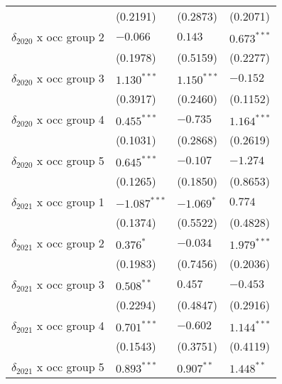 \begin{tabular}{llll}
                                       &           (0.2191) &           (0.2873) &           (0.2071) \\
$\delta_{2020}$ x occ group 2          &           $-0.066$ &            $0.143$ &      $0.673^{***}$ \\
                                       &           (0.1978) &           (0.5159) &           (0.2277) \\
$\delta_{2020}$ x occ group 3          &      $1.130^{***}$ &      $1.150^{***}$ &           $-0.152$ \\
                                       &           (0.3917) &           (0.2460) &           (0.1152) \\
$\delta_{2020}$ x occ group 4          &      $0.455^{***}$ &           $-0.735$ &      $1.164^{***}$ \\
                                       &           (0.1031) &           (0.2868) &           (0.2619) \\
$\delta_{2020}$ x occ group 5          &      $0.645^{***}$ &           $-0.107$ &           $-1.274$ \\
                                       &           (0.1265) &           (0.1850) &           (0.8653) \\
$\delta_{2021}$ x occ group 1          &     $-1.087^{***}$ &         $-1.069^*$ &            $0.774$ \\
                                       &           (0.1374) &           (0.5522) &           (0.4828) \\
$\delta_{2021}$ x occ group 2          &          $0.376^*$ &           $-0.034$ &      $1.979^{***}$ \\
                                       &           (0.1983) &           (0.7456) &           (0.2036) \\
$\delta_{2021}$ x occ group 3          &       $0.508^{**}$ &            $0.457$ &           $-0.453$ \\
                                       &           (0.2294) &           (0.4847) &           (0.2916) \\
$\delta_{2021}$ x occ group 4          &      $0.701^{***}$ &           $-0.602$ &      $1.144^{***}$ \\
                                       &           (0.1543) &           (0.3751) &           (0.4119) \\
$\delta_{2021}$ x occ group 5          &      $0.893^{***}$ &       $0.907^{**}$ &       $1.448^{**}$ \\

\end{tabular}
